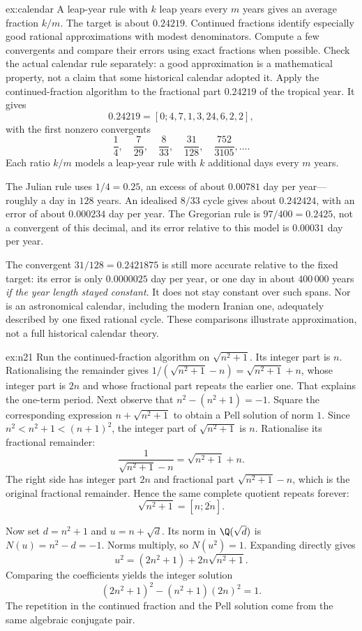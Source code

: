 \begin{solution}{ex:calendar}
\idea A leap-year rule with $k$ leap years every $m$ years gives an average fraction $k/m$. The target is about $0.24219$. Continued fractions identify especially good rational approximations with modest denominators. Compute a few convergents and compare their errors using exact fractions when possible. Check the actual calendar rule separately: a good approximation is a mathematical property, not a claim that some historical calendar adopted it.
\writeup Apply the continued-fraction algorithm to the fractional part $0.24219$ of the tropical year. It gives
\[
0.24219=[0;4,7,1,3,24,6,2,2],
\]
with the first nonzero convergents
\[
\frac14,\quad\frac7{29},\quad\frac8{33},\quad
\frac{31}{128},\quad\frac{752}{3105},\ldots.
\]
Each ratio $k/m$ models a leap-year rule with $k$ additional days every $m$ years.

The Julian rule uses $1/4=0.25$, an excess of about $0.00781$ day per year—roughly a day in $128$ years. An idealised $8/33$ cycle gives about $0.242424$, with an error of about $0.000234$ day per year. The Gregorian rule is $97/400=0.2425$, not a convergent of this decimal, and its error relative to this model is $0.00031$ day per year.

The convergent $31/128=0.2421875$ is still more accurate relative to the fixed target: its error is only $0.0000025$ day per year, or one day in about $400\,000$ years \emph{if the year length stayed constant}. It does not stay constant over such spans. Nor is an astronomical calendar, including the modern Iranian one, adequately described by one fixed rational cycle. These comparisons illustrate approximation, not a full historical calendar theory.
\end{solution}

\begin{solution}{ex:n21}
\idea Run the continued-fraction algorithm on $\sqrt{n^2+1}$. Its integer part is $n$. Rationalising the remainder gives $1/(\sqrt{n^2+1}-n)=\sqrt{n^2+1}+n$, whose integer part is $2n$ and whose fractional part repeats the earlier one. That explains the one-term period. Next observe that $n^2-(n^2+1)=-1$. Square the corresponding expression $n+\sqrt{n^2+1}$ to obtain a Pell solution of norm $1$.
\writeup Since $n^2<n^2+1<(n+1)^2$, the integer part of $\sqrt{n^2+1}$ is $n$. Rationalise its fractional remainder:
\[
\frac1{\sqrt{n^2+1}-n}
=\sqrt{n^2+1}+n.
\]
The right side has integer part $2n$ and fractional part $\sqrt{n^2+1}-n$, which is the original fractional remainder. Hence the same complete quotient repeats forever:
\[
\sqrt{n^2+1}=[n;\overline{2n}].
\]

Now set $d=n^2+1$ and $u=n+\sqrt d$. Its norm in $\Q(\sqrt d)$ is
$N(u)=n^2-d=-1$. Norms multiply, so $N(u^2)=1$. Expanding directly gives
\[
u^2=(2n^2+1)+2n\sqrt{n^2+1}.
\]
Comparing the coefficients yields the integer solution
\[
(2n^2+1)^2-(n^2+1)(2n)^2=1.
\]
The repetition in the continued fraction and the Pell solution come from the same algebraic conjugate pair.
\end{solution}

